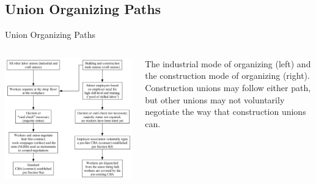\documentclass{beamer}
\begin{document}
\subsection{Union Organizing Paths}
\begin{frame}{Union Organizing Paths}
  \begin{columns}
    \includegraphics[width=\linewidth]{../images/organizing_paths}

    The industrial mode of organizing (left) and the construction mode of organizing (right). Construction unions may follow either path, but other unions may not voluntarily negotiate the way that construction unions can.
    \end{columns}
\end{frame}
\end{document}
